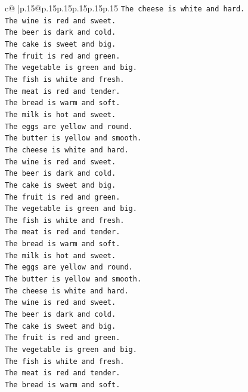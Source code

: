 \documentclass{article}
\begin{document}
{\begin{supertabular}{c@{$\;$}|p{.15\linewidth}@{}p{.15\linewidth}p{.15\linewidth}p{.15\linewidth}p{.15\linewidth}p{.15\linewidth}}
{{{\texttt{The cheese is white and hard.} \\
\texttt{The wine is red and sweet.} \\
\texttt{The beer is dark and cold.} \\
\texttt{The cake is sweet and big.} \\
\texttt{The fruit is red and green.} \\
\texttt{The vegetable is green and big.} \\
\texttt{The fish is white and fresh.} \\
\texttt{The meat is red and tender.} \\
\texttt{The bread is warm and soft.} \\
\texttt{The milk is hot and sweet.} \\
\texttt{The eggs are yellow and round.} \\
\texttt{The butter is yellow and smooth.} \\
\texttt{The cheese is white and hard.} \\
\texttt{The wine is red and sweet.} \\
\texttt{The beer is dark and cold.} \\
\texttt{The cake is sweet and big.} \\
\texttt{The fruit is red and green.} \\
\texttt{The vegetable is green and big.} \\
\texttt{The fish is white and fresh.} \\
\texttt{The meat is red and tender.} \\
\texttt{The bread is warm and soft.} \\
\texttt{The milk is hot and sweet.} \\
\texttt{The eggs are yellow and round.} \\
\texttt{The butter is yellow and smooth.} \\
\texttt{The cheese is white and hard.} \\
\texttt{The wine is red and sweet.} \\
\texttt{The beer is dark and cold.} \\
\texttt{The cake is sweet and big.} \\
\texttt{The fruit is red and green.} \\
\texttt{The vegetable is green and big.} \\
\texttt{The fish is white and fresh.} \\
\texttt{The meat is red and tender.} \\
\texttt{The bread is warm and soft.} \\
}}}
\end{supertabular}}
\end{document}
